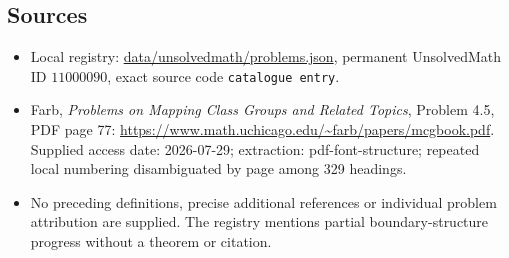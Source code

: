 \documentclass[11pt]{article}
\begin{document}
\subsection{Sources}
\begin{itemize}
\item Local registry: \url{data/unsolvedmath/problems.json}, permanent UnsolvedMath ID $11000090$, exact source code \texttt{catalogue entry}.
\item Farb, \emph{Problems on Mapping Class Groups and Related Topics}, Problem 4.5, PDF page 77: \url{https://www.math.uchicago.edu/~farb/papers/mcgbook.pdf}. Supplied access date: 2026-07-29; extraction: pdf-font-structure; repeated local numbering disambiguated by page among 329 headings.
\item No preceding definitions, precise additional references or individual problem attribution are supplied. The registry mentions partial boundary-structure progress without a theorem or citation.
\end{itemize}
\end{document}
